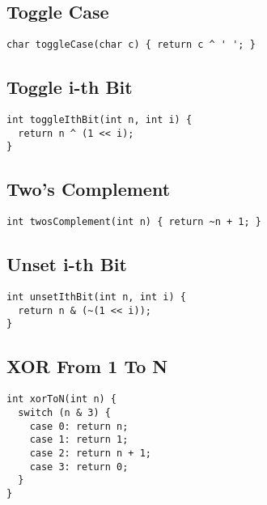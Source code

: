 \documentclass[twoside]{article}
\begin{document}
\begin{multicols*}{2}
\subsectionfont{\large\bfseries\sffamily\underline}
\subsection*{Toggle Case}
\begin{verbatim}
char toggleCase(char c) { return c ^ ' '; }
\end{verbatim}

\subsectionfont{\large\bfseries\sffamily\underline}
\subsection*{Toggle i-th Bit}
\begin{verbatim}
int toggleIthBit(int n, int i) {
  return n ^ (1 << i);
}
\end{verbatim}

\subsectionfont{\large\bfseries\sffamily\underline}
\subsection*{Two's Complement}
\begin{verbatim}
int twosComplement(int n) { return ~n + 1; }
\end{verbatim}

\subsectionfont{\large\bfseries\sffamily\underline}
\subsection*{Unset i-th Bit}
\begin{verbatim}
int unsetIthBit(int n, int i) {
  return n & (~(1 << i));
}
\end{verbatim}

\subsectionfont{\large\bfseries\sffamily\underline}
\subsection*{XOR From 1 To N}
\begin{verbatim}
int xorToN(int n) {
  switch (n & 3) {
    case 0: return n;
    case 1: return 1;
    case 2: return n + 1;
    case 3: return 0;
  }
}
\end{verbatim}


\end{multicols*}
\end{document}
